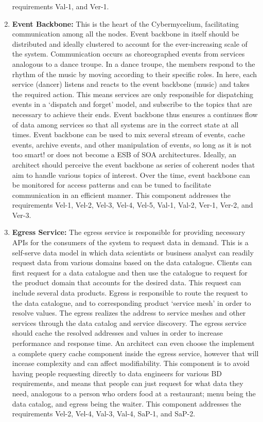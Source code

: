 \documentclass[review]{elsarticle}
\begin{document}
\begin{enumerate}
    requirements Val-1, and Ver-1.
    \item \textbf{Event Backbone:} This is the heart of the Cybermycelium, facilitating communication among all the nodes. Event backbone in itself should be distributed and ideally clustered to account for the ever-increasing scale of the system. Communication occurs as choreographed events from services analogous to a dance troupe. In a dance troupe, the members respond to the rhythm of the music by moving according to their specific roles. In here, each service (dancer) listens and reacts to the event backbone (music) and takes the required action. This means services are only responsible for dispatching events in a `dispatch and forget' model, and subscribe to the topics that are necessary to achieve their ends. Event backbone thus ensures a continues flow of data among services so that all systems are in the correct state at all times. Event backbone can be used to mix several stream of events, cache events, archive events, and other manipulation of events, so long as it is not too smart! or does not become a ESB of SOA architectures. Ideally, an architect should perceive the event backbone as series of coherent nodes that aim to handle various topics of interest. Over the time, event backbone can be monitored for access patterns and can be tuned to facilitate communication in an efficient manner. This component addresses the requirements Vel-1, Vel-2, Vel-3, Vel-4, Vel-5, Val-1, Val-2, Ver-1, Ver-2, and Ver-3.
    \item \textbf{Egress Service:} The egress service is responsible for providing necessary APIs for the consumers of the system to request data in demand. This is a self-serve data model in which data scientists or business analyst can readily request data from various domains based on the data catalogue. Clients can first request for a data catalogue and then use the catalogue to request for the product domain that accounts for the desired data. This request can include several data products. Egress is responsible to route the request to the data catalogue, and to corresponding product `service mesh' in order to resolve values. The egress realizes the address to service meshes and other services through the data catalog and service discovery. The egress service should cache the resolved addresses and values in order to increase performance and response time. An architect can even choose the implement a complete query cache component inside the egress service, however that will incease complexity and can affect modifiability. This component is to avoid having people requesting directly to data engineers for various BD requirements, and means that people can just request for what data they need, analogous to a person who orders food at a restaurant; menu being the data catalog, and egress being the waiter. This component addresses the requirements Vel-2, Vel-4, Val-3, Val-4, SaP-1, and SaP-2.

\end{enumerate}
\end{document}
